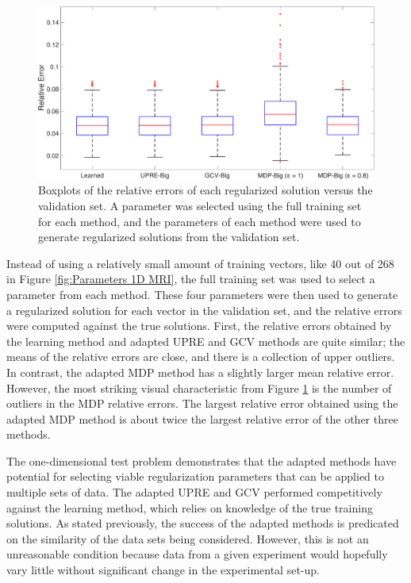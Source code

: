 \documentclass[12pt]{article}
\begin{document}
\begin{figure}[ht]
\includegraphics[width=1.0\textwidth]{Figures/Errors1D_mri.pdf}
\caption{Boxplots of the relative errors of each regularized solution versus the validation set. A parameter was selected using the full training set for each method, and the parameters of each method were used to generate regularized solutions from the validation set.}
\label{fig:Errors 1D MRI}
\end{figure}

\noindent Instead of using a relatively small amount of training vectors, like 40 out of 268 in Figure \ref{fig:Parameters 1D MRI}, the full training set was used to select a parameter from each method. These four parameters were then used to generate a regularized solution for each vector in the validation set, and the relative errors were computed against the true solutions. First, the relative errors obtained by the learning method and adapted UPRE and GCV methods are quite similar; the means of the relative errors are close, and there is a collection of upper outliers. In contrast, the adapted MDP method has a slightly larger mean relative error. However, the most striking visual characteristic from Figure \ref{fig:Errors 1D MRI} is the number of outliers in the MDP relative errors. The largest relative error obtained using the adapted MDP method is about twice the largest relative error of the other three methods. \par 
The one-dimensional test problem demonstrates that the adapted methods have potential for selecting viable regularization parameters that can be applied to multiple sets of data. The adapted UPRE and GCV performed competitively against the learning method, which relies on knowledge of the true training solutions. As stated previously, the success of the adapted methods is predicated on the similarity of the data sets being considered. However, this is not an unreasonable condition because data from a given experiment would hopefully vary little without significant change in the experimental set-up.
\end{document}
